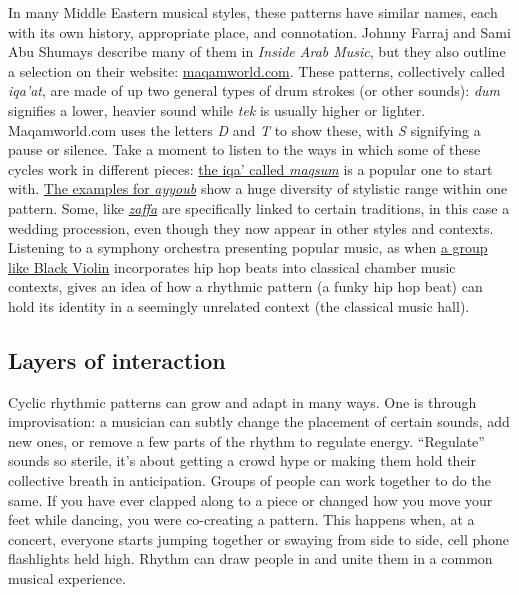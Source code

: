 \documentclass[twoside]{article}
\begin{document}
In many Middle Eastern musical styles, these patterns have similar
names, each with its own history, appropriate place, and connotation.
Johnny Farraj and Sami Abu Shumays describe many of them in \emph{Inside
Arab Music}, but they also outline a selection on their website:
\href{http://www.maqamworld.com/en/iqaa.php}{maqamworld.com}. These
patterns, collectively called \emph{iqa'at}, are made of up two general
types of drum strokes (or other sounds): \emph{dum} signifies a lower,
heavier sound while \emph{tek} is usually higher or lighter.
Maqamworld.com uses the letters \emph{D} and \emph{T} to show these,
with \emph{S} signifying a pause or silence. Take a moment to listen to
the ways in which some of these cycles work in different pieces:
\href{http://www.maqamworld.com/en/iqaa/maqsum.php}{the iqa' called
\emph{maqsum}} is a popular one to start with.
\href{http://www.maqamworld.com/en/iqaa/ayyub.php}{The examples for
\emph{ayyoub}} show a huge diversity of stylistic range within one
pattern. Some, like
\href{http://www.maqamworld.com/en/iqaa/zaffa.php}{\emph{zaffa}} are
specifically linked to certain traditions, in this case a wedding
procession, even though they now appear in other styles and contexts.
Listening to a symphony orchestra presenting popular music, as when
\href{https://www.youtube.com/watch?v=Tb5zO7OybPg}{a group like Black
Violin} incorporates hip hop beats into classical chamber music
contexts, gives an idea of how a rhythmic pattern (a funky hip hop beat)
can hold its identity in a seemingly unrelated context (the classical
music hall).

\hypertarget{layers-of-interaction}{%
\subsection{Layers of interaction}\label{layers-of-interaction}}

Cyclic rhythmic patterns can grow and adapt in many ways. One is through
improvisation: a musician can subtly change the placement of certain
sounds, add new ones, or remove a few parts of the rhythm to regulate
energy. ``Regulate'' sounds so sterile, it's about getting a crowd hype
or making them hold their collective breath in anticipation. Groups of
people can work together to do the same. If you have ever clapped along
to a piece or changed how you move your feet while dancing, you were
co-creating a pattern. This happens when, at a concert, everyone starts
jumping together or swaying from side to side, cell phone flashlights
held high. Rhythm can draw people in and unite them in a common musical
experience.
\end{document}
